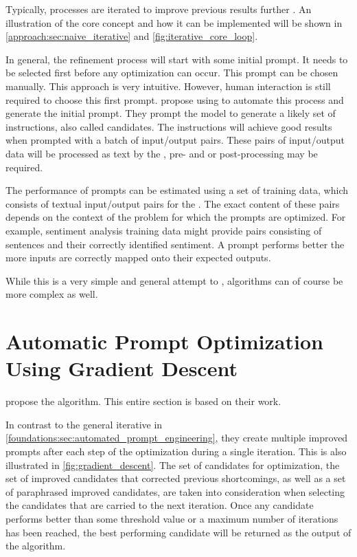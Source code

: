 Typically, \APE processes are iterated to improve previous results further \citeiterative.
An illustration of the core concept and how it can be implemented will be shown in \autoref{approach:sec:naive_iterative} and  \autoref{fig:iterative_core_loop}.

In general, the refinement process will start with some initial prompt.
It needs to be selected first before any optimization can occur.
This prompt can be chosen manually.
This approach is very intuitive.
However, human interaction is still required to choose this first prompt.
 propose using \LLMs to automate this process and generate the initial prompt.
They prompt the model to generate a likely set of instructions, also called candidates.
The instructions will achieve good results when prompted with a batch of input/output pairs.
These pairs of input/output data will be processed as text by the \LLM, pre- and or post-processing may be required.

The performance of prompts can be estimated using a set of training data, which consists of textual input/output pairs for the \LLM.
The exact content of these pairs depends on the context of the problem for which the prompts are optimized. 
For example, sentiment analysis training data might provide pairs consisting of sentences and their correctly identified sentiment.
A prompt performs better the more inputs are correctly mapped onto their expected outputs.

While this is a very simple and general attempt to \APE, algorithms can of course be more complex as well.


\section{Automatic Prompt Optimization Using Gradient Descent}
\label{sec:gradient_descent}
 propose the \ProTeGi algorithm.
This entire section is based on their work.

In contrast to the general iterative \APE in \autoref{foundations:sec:automated_prompt_engineering}, they create multiple improved prompts after each step of the optimization during a single iteration.
This is also illustrated in \autoref{fig:gradient_descent}.
The set of candidates for optimization, the set of improved candidates that corrected previous shortcomings, as well as a set of paraphrased improved candidates, are taken into consideration when selecting the candidates that are carried to the next iteration.
Once any candidate performs better than some threshold value or a maximum number of iterations has been reached, the best performing candidate will be returned as the output of the \ProTeGi algorithm.

